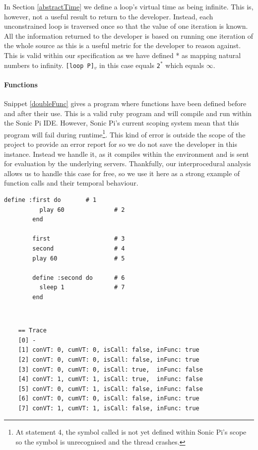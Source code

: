 \documentclass[11pt, abstracton, twoside, titlepage=true]{scrartcl}
\begin{document}
In Section \ref{abstractTime} we define a loop's virtual time as being infinite. 
This is, however, not a useful result to return to the developer. Instead, each 
unconstrained loop is traversed once so that the value of one iteration is known. 
All the information returned to the developer is based on running one iteration 
of the whole source as this is a useful metric for the developer to reason against. 
This is valid within our specification as we have defined * as mapping natural 
numbers to infinity. \texttt{[loop P]$_{v}$} in this case equals \texttt{2$^{*}$} 
which equals \texttt{$\infty$}.

\paragraph{Functions}
Snippet \ref{doubleFunc} gives a program where functions have been defined before 
and after their use. This is a valid ruby program and will compile and run within 
the Sonic Pi IDE. However, Sonic Pi's current scoping system mean that this program 
will fail during runtime\footnote{At statement 4, the symbol called is not 
yet defined within Sonic Pi's scope so the symbol is unrecognised and the thread 
crashes.}. This kind of error is outside the scope of the project to provide an error 
report for so we do not save the developer in this instance. Instead we handle it, 
as it compiles within the environment and is sent for evaluation by the underlying 
servers. Thankfully, our interprocedural analysis allows us to handle this case for 
free, so we use it here as a strong example of function calls and their temporal 
behaviour. 

\begin{minipage}{\textwidth}
	\begin{lstlisting}[style = sonicpi]
        define :first do       # 1
          play 60              # 2
        end
        
        first                  # 3
        second                 # 4
        play 60                # 5

        define :second do      # 6
          sleep 1              # 7
        end
	\end{lstlisting}
	 \label{doubleFunc}
\end{minipage}
\\
\begin{lstlisting}
    == Trace
    [0] -
    [1] conVT: 0, cumVT: 0, isCall: false, inFunc: true
    [2] conVT: 0, cumVT: 0, isCall: false, inFunc: true
    [3] conVT: 0, cumVT: 0, isCall: true,  inFunc: false
    [4] conVT: 1, cumVT: 1, isCall: true,  inFunc: false
    [5] conVT: 0, cumVT: 1, isCall: false, inFunc: false
    [6] conVT: 0, cumVT: 0, isCall: false, inFunc: true
    [7] conVT: 1, cumVT: 1, isCall: false, inFunc: true
\end{lstlisting}
\end{document}
